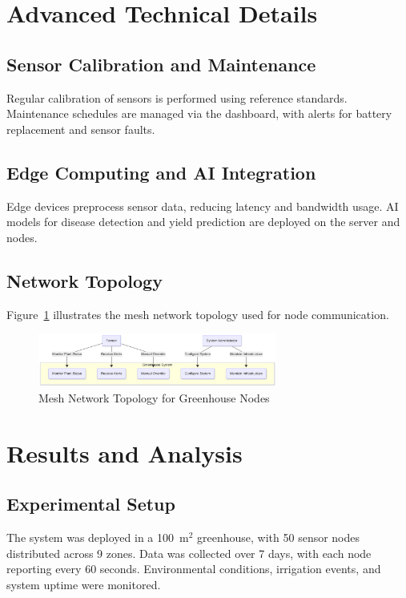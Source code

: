 \documentclass[12pt,a4paper]{article}
\begin{document}
\section{Advanced Technical Details}
\subsection{Sensor Calibration and Maintenance}
Regular calibration of sensors is performed using reference standards. Maintenance schedules are managed via the dashboard, with alerts for battery replacement and sensor faults.

\subsection{Edge Computing and AI Integration}
Edge devices preprocess sensor data, reducing latency and bandwidth usage. AI models for disease detection and yield prediction are deployed on the server and nodes.

\subsection{Network Topology}
Figure~\ref{fig:network} illustrates the mesh network topology used for node communication.

\begin{figure}[H]
    \centering
    \includegraphics[width=0.7\textwidth]{images/useCaseDiagram.png}
    \caption{Mesh Network Topology for Greenhouse Nodes}\label{fig:network}
\end{figure}

\section{Results and Analysis}
\subsection{Experimental Setup}
The system was deployed in a 100~m$^2$ greenhouse, with 50 sensor nodes distributed across 9 zones. Data was collected over 7 days, with each node reporting every 60 seconds. Environmental conditions, irrigation events, and system uptime were monitored.
\end{document}
